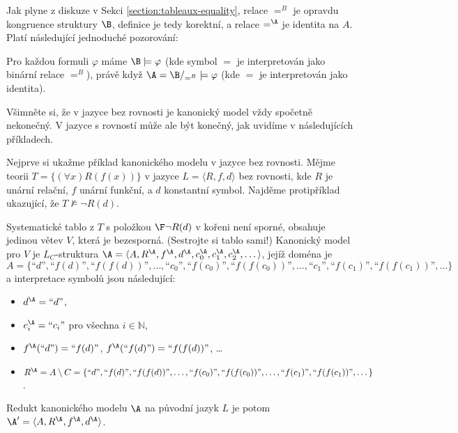 Jak plyne z diskuze v Sekci \ref{section:tableaux-equality}, relace $=^B$ je opravdu kongruence struktury $\B$, definice je tedy korektní, a relace $=^\A$ je identita na $A$. Platí následující jednoduché pozorování:


\begin{observation}\label{canonical-with-equality-satisfies-the-same}
    Pro každou formuli $\varphi$ máme $\B\models\varphi$ (kde symbol $=$ je interpretován jako binární relace $=^B$), právě když $\A=\B/_{=^B}\models\varphi$ (kde $=$ je interpretován jako identita).    
\end{observation}


Všimněte si, že v jazyce bez rovnosti je kanonický model vždy spočetně nekonečný. V jazyce s rovností může ale být konečný, jak uvidíme v následujících příkladech.

\begin{example}
    Nejprve si ukažme příklad kanonického modelu v jazyce bez rovnosti. Mějme teorii $T=\{(\forall x)R(f(x))\}$ v jazyce $L=\langle R,f,d \rangle$ bez rovnosti, kde $R$ je unární relační, $f$ unární funkční, a $d$ konstantní symbol. Najděme protipříklad ukazující, že $T\not\models\neg R(d)$. 
    
    Systematické tablo z $T$ s položkou $\F\neg R(d)$ v kořeni není sporné, obsahuje jedinou větev $V$, která je bezesporná. (Sestrojte si tablo sami!) Kanonický model pro $V$ je $L_C$-struktura $\A=\langle A,R^\A,f^\A,d^\A,c_0^\A,c_1^\A,c_2^\A,\dots\rangle$, jejíž doména je
    $$
    A=\{\text{``$d$''},\text{``$f(d)$''},\text{``$f(f(d))$''},\dots,\text{``$c_0$''},\text{``$f(c_0)$''},\text{``$f(f(c_0))$''},\dots,\text{``$c_1$''},\text{``$f(c_1)$''},\text{``$f(f(c_1))$''},\dots\}
    $$
    a interpretace symbolů jsou následující:
    \begin{itemize}
        \item $d^\A=\text{``$d$''}$,
        \item $c^\A_i=\text{``$c_i$''}$ pro všechna $i\in \mathbb N$,
        \item $f^\A(\text{``$d$''})=\text{``$f(d)$''}$, $f^\A(\text{``$f(d)$''})=\text{``$f(f(d))$''}$, \dots
        \item $R^\A=A\setminus C=\{\text{``$d$''},\text{``$f(d)$''},\text{``$f(f(d))$''},\dots,\text{``$f(c_0)$''},\text{``$f(f(c_0))$''},\dots,\text{``$f(c_1)$''},\text{``$f(f(c_1))$''},\dots\}$.
    \end{itemize}
    Redukt kanonického modelu $\A$ na původní jazyk $L$ je potom $\A'=\langle A, R^\A, f^\A, d^\A\rangle$.
\end{example}

